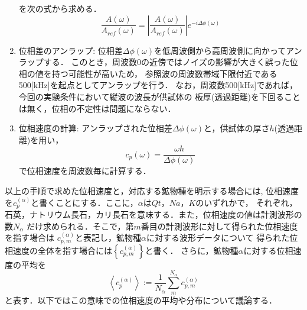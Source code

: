 \begin{enumerate}
を次の式から求める．
\begin{equation}
	\frac{A(\omega)}{A_{ref}(\omega)}
	=
	\left|
	\frac{A(\omega)}{A_{ref}(\omega)}
	\right|
	e^{-i\Delta \phi(\omega)}
	\label{eqn:deconv}
\end{equation}
\item
位相差のアンラップ:
	位相差$\Delta \phi(\omega)$を低周波側から高周波側に向かってアンラップする．
	このとき，周波数$0$の近傍ではノイズの影響が大きく誤った位相の値を持つ可能性が高いため，
	参照波の周波数帯域下限付近である500[kHz]を起点としてアンラップを行う．
	なお，周波数500[kHz]であれば，今回の実験条件において縦波の波長が供試体の
	板厚(透過距離)を下回ることは無く，位相の不定性は問題にならない．
\item
位相速度の計算:
	アンラップされた位相差$\Delta \phi(\omega)$と，供試体の厚さ$h$(透過距離)を用い，
\begin{equation}
	c_p(\omega)=\frac{\omega h}{\Delta \phi(\omega)}
	\label{eqn:cp_phi}
\end{equation}
	で位相速度を周波数毎に計算する．
\end{enumerate}
以上の手順で求めた位相速度と，対応する鉱物種を明示する場合には,
位相速度を$c_p^{(\alpha)}$と書くことにする．ここに，$\alpha$は$Qt，Na，K$のいずれかで，
それぞれ，石英，ナトリウム長石，カリ長石を意味する．また，位相速度の値は計測波形の数$N_\alpha$
だけ求められる．そこで，第$m$番目の計測波形に対して得られた位相速度を指す場合は
$c_{p,m}^{(\alpha)}$と表記し，鉱物種$\alpha$に対する波形データについて
得られた位相速度の全体を指す場合には$\left\{ c_{p,m}^{(\alpha)}\right\}$と書く．
さらに，鉱物種$\alpha$に対する位相速度の平均を
\begin{equation}
	\left< c_p^{(\alpha)}\right>:= \frac{1}{N_\alpha}\sum_{m}^{N_\alpha} c_{p,m}^{(\alpha)}
	\label{eqn:}
\end{equation}
と表す．以下ではこの意味での位相速度の平均や分布について議論する．
%
%

